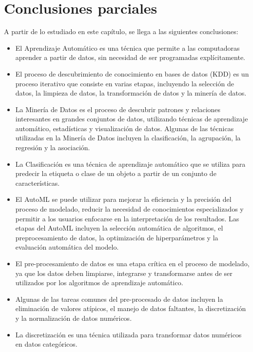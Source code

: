\section{Conclusiones parciales}


A partir de lo estudiado en este capítulo, se llega a las siguientes conclusiones:

\begin{itemize}
	\item El Aprendizaje Automático es una técnica que permite a las computadoras aprender a partir de datos, sin necesidad de ser programadas explícitamente.
	\item El proceso de descubrimiento de conocimiento en bases de datos (KDD) es un proceso iterativo que consiste en varias etapas, incluyendo la selección de datos, la limpieza de datos, la transformación de datos y la minería de datos.
	\item La Minería de Datos es el proceso de descubrir patrones y relaciones interesantes en grandes conjuntos de datos, utilizando técnicas de aprendizaje automático, estadísticas y visualización de datos. Algunas de las técnicas utilizadas en la Minería de Datos incluyen la clasificación, la agrupación, la regresión y la asociación.
	\item La Clasificación es una técnica de aprendizaje automático que se utiliza para predecir la etiqueta o clase de un objeto a partir de un conjunto de características.
	\item El AutoML se puede utilizar para mejorar la eficiencia y la precisión del proceso de modelado, reducir la necesidad de conocimientos especializados y permitir a los usuarios enfocarse en la interpretación de los resultados. Las etapas del AutoML incluyen la selección automática de algoritmos, el preprocesamiento de datos, la optimización de hiperparámetros y la evaluación automática del modelo.
	\item El pre-procesamiento de datos es una etapa crítica en el proceso de modelado, ya que los datos deben limpiarse, integrarse y transformarse antes de ser utilizados por los algoritmos de aprendizaje automático.
	\item Algunas de las tareas comunes del pre-procesado de datos incluyen la eliminación de valores atípicos, el manejo de datos faltantes, la discretización y la normalización de datos numéricos.
	\item La discretización es una técnica utilizada para transformar datos numéricos en datos categóricos.

\end{itemize}
